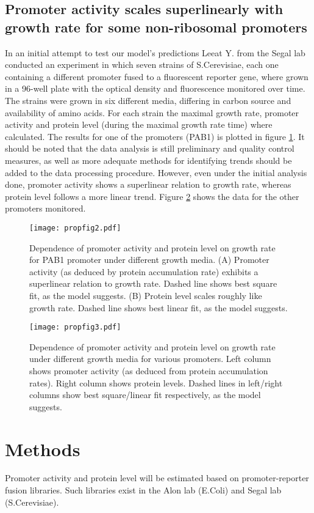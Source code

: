 \documentclass[a4page,notitlepage]{article}
\begin{document}
\subsection{Promoter activity scales superlinearly with growth rate for some non-ribosomal promoters}
In an initial attempt to test our model's predictions Leeat Y. from the Segal lab conducted an experiment in which seven strains of S.Cerevisiae, each one containing a different promoter fused to a fluorescent reporter gene, where grown in a 96-well plate with the optical density and fluorescence monitored over time.
The strains were grown in six different media, differing in carbon source and availability of amino acids.
For each strain the maximal growth rate, promoter activity and protein level (during the maximal growth rate time) where calculated.
The results for one of the promoters (PAB1) is plotted in figure \ref{gr-fl-fig}.
It should be noted that the data analysis is still preliminary and quality control measures, as well as more adequate methods for identifying trends should be added to the data processing procedure.
However, even under the initial analysis done, promoter activity shows a superlinear relation to growth rate, whereas protein level follows a more linear trend.
Figure \ref{gr-fl-mult} shows the data for the other promoters monitored.
\begin{figure}[h]
\texttt{[image: propfig2.pdf]}
\caption{Dependence of promoter activity and protein level on growth rate for PAB1 promoter under different growth media.
(A) Promoter activity (as deduced by protein accumulation rate) exhibits a superlinear relation to growth rate.
Dashed line shows best square fit, as the model suggests.
(B) Protein level scales roughly like growth rate.
Dashed line shows best linear fit, as the model suggests.
}
\label{gr-fl-fig}
\end{figure}
\begin{figure}[h]
\texttt{[image: propfig3.pdf]}
\caption{Dependence of promoter activity and protein level on growth rate under different growth media for various promoters.
Left column shows promoter activity (as deduced from protein accumulation rates).
Right column shows protein levels.
Dashed lines in left/right columns show best square/linear fit respectively, as the model suggests.
}
\label{gr-fl-mult}
\end{figure}
\section{Methods}
Promoter activity and protein level will be estimated based on promoter-reporter fusion libraries.
Such libraries exist in the Alon lab (E.Coli) and Segal lab (S.Cerevisiae).
\end{document}
